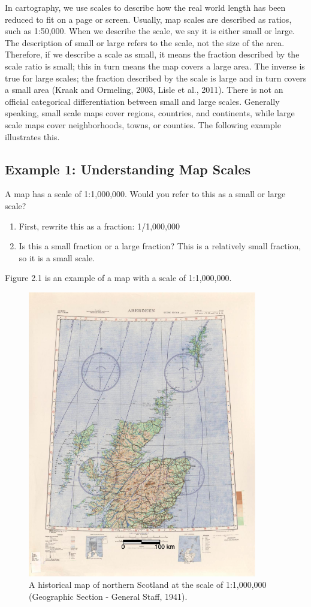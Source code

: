 \documentclass[a4paper , 12pt]{book}
\begin{document}
In cartography, we use scales to describe how the real world length has been reduced to fit on a page or screen. Usually, map scales are described as ratios, such as 1:50,000. When we describe the scale, we say it is either small or large. The description of small or large refers to the scale, not the size of the area. Therefore, if we describe a scale as small, it means the fraction described by the scale ratio is small; this in turn means the map covers a large area. The inverse is true for large scales; the fraction described by the scale is large and in turn covers a small area (Kraak and Ormeling, 2003, Lisle et al., 2011). There is not an official categorical differentiation between small and large scales. Generally speaking, small scale maps cover regions, countries, and continents, while large scale maps cover neighborhoods, towns, or counties. The following example illustrates this.

\subsection*{Example 1: Understanding Map Scales}

A map has a scale of 1:1,000,000. Would you refer to this as a small or large scale?

\begin{enumerate}
    \item First, rewrite this as a fraction: 1/1,000,000
    \item Is this a small fraction or a large fraction? This is a relatively small fraction, so it is a small scale. 
\end{enumerate}

Figure 2.1 is an example of a map with a scale of 1:1,000,000.

\begin{figure}[ht]
    \centering
    \includegraphics[width=10cm]{ch2f1.pdf}
    \caption{A historical map of northern Scotland at the scale of 1:1,000,000 (Geographic Section - General Staff, 1941).}
\end{figure}
\end{document}
